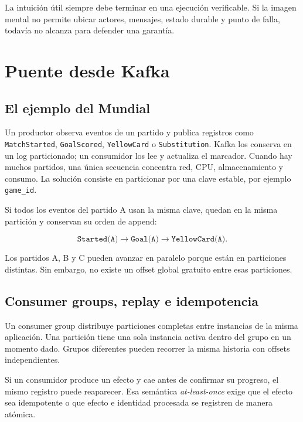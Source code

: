 \documentclass[variant=apuntes,cover=institutional,mode=screen]{ua-engineering-v6-article}
\begin{document}
\begin{uakeybox}
La intuición útil siempre debe terminar en una ejecución verificable. Si la imagen mental no permite ubicar actores, mensajes, estado durable y punto de falla, todavía no alcanza para defender una garantía.
\end{uakeybox}

\section{Puente desde Kafka}

\subsection{El ejemplo del Mundial}

Un productor observa eventos de un partido y publica registros como \texttt{MatchStarted}, \texttt{GoalScored}, \texttt{YellowCard} o \texttt{Substitution}. Kafka los conserva en un log particionado; un consumidor los lee y actualiza el marcador. Cuando hay muchos partidos, una única secuencia concentra red, CPU, almacenamiento y consumo. La solución consiste en particionar por una clave estable, por ejemplo \texttt{game\_id}.

Si todos los eventos del partido A usan la misma clave, quedan en la misma partición y conservan su orden de append:

\[
\texttt{Started(A)}\rightarrow\texttt{Goal(A)}\rightarrow\texttt{YellowCard(A)}.
\]

Los partidos A, B y C pueden avanzar en paralelo porque están en particiones distintas. Sin embargo, no existe un offset global gratuito entre esas particiones.

\subsection{Consumer groups, replay e idempotencia}

Un consumer group distribuye particiones completas entre instancias de la misma aplicación. Una partición tiene una sola instancia activa dentro del grupo en un momento dado. Grupos diferentes pueden recorrer la misma historia con offsets independientes.

Si un consumidor produce un efecto y cae antes de confirmar su progreso, el mismo registro puede reaparecer. Esa semántica \emph{at-least-once} exige que el efecto sea idempotente o que efecto e identidad procesada se registren de manera atómica.
\end{document}
